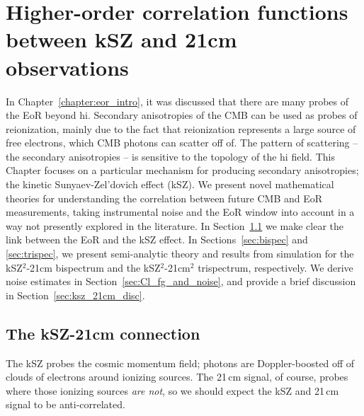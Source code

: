 \chapter{Higher-order correlation functions between kSZ and 21cm observations}
\label{chapter:ksz_21cm}

In Chapter~\ref{chapter:eor_intro}, it was discussed that there are many probes of the EoR beyond {\sc hi}. Secondary anisotropies of the CMB can be used as probes of reionization, mainly due to the fact that reionization represents a large source of free electrons, which CMB photons can scatter off of. The pattern of scattering -- the secondary anisotropies -- is sensitive to the topology of the {\sc hi} field. This Chapter focuses on a particular mechanism for producing secondary anisotropies; the kinetic Sunyaev-Zel'dovich effect (kSZ). We present novel mathematical theories for understanding the correlation between future CMB and EoR measurements, taking instrumental noise and the EoR window into account in a way not presently explored in the literature. In Section~\ref{sec:ksz-21cm} we make clear the link between the EoR and the kSZ effect. In Sections~\ref{sec:bispec} and \ref{sec:trispec}, we present semi-analytic theory and results from simulation for the kSZ$^2$-21cm bispectrum and the kSZ$^2$-21cm$^2$ trispectrum, respectively. We derive noise estimates in Section~\ref{sec:Cl_fg_and_noise}, and provide a brief discussion in Section~\ref{sec:ksz_21cm_disc}.

\section{The kSZ-21cm connection}
\label{sec:ksz-21cm}

The kSZ probes the cosmic momentum field; photons are Doppler-boosted off of clouds of electrons around ionizing sources. The 21\,cm signal, of course, probes where those ionizing sources \textit{are not}, so we should expect the kSZ and 21\,cm signal to be anti-correlated. 

